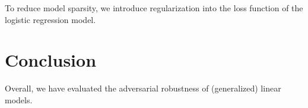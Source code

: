 \documentclass{article}
\begin{document}
To reduce model sparsity, we introduce regularization into the loss function of the logistic regression model. 

\section{Conclusion}
Overall, we have evaluated the adversarial robustness of (generalized) linear models.



\newpage


\end{document}
